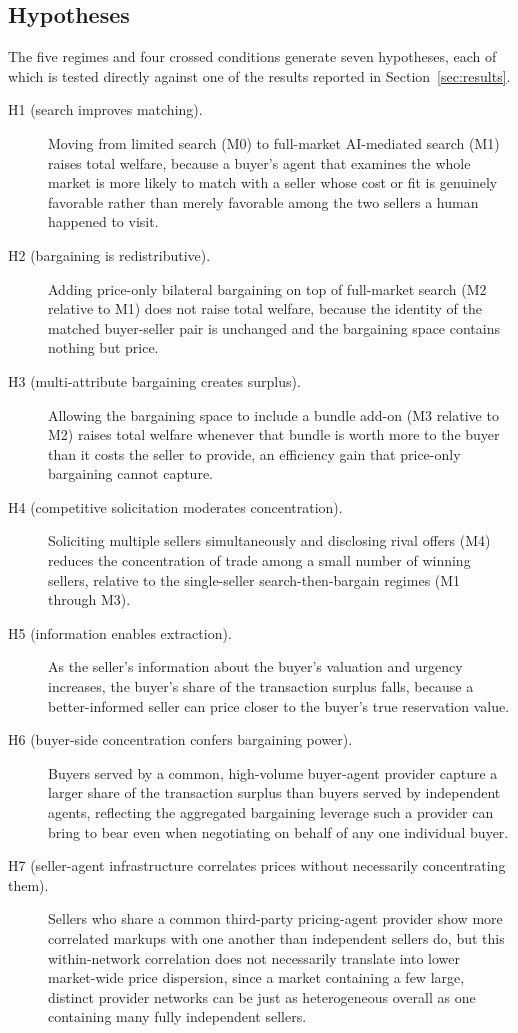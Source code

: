 \documentclass[review]{elsarticle}
\begin{document}
\subsection{Hypotheses}

The five regimes and four crossed conditions generate seven hypotheses, each of which is tested directly against one of the results reported in Section~\ref{sec:results}.

\begin{description}
\item[H1 (search improves matching).] Moving from limited search (M0) to full-market AI-mediated search (M1) raises total welfare, because a buyer's agent that examines the whole market is more likely to match with a seller whose cost or fit is genuinely favorable rather than merely favorable among the two sellers a human happened to visit.
\item[H2 (bargaining is redistributive).] Adding price-only bilateral bargaining on top of full-market search (M2 relative to M1) does not raise total welfare, because the identity of the matched buyer-seller pair is unchanged and the bargaining space contains nothing but price.
\item[H3 (multi-attribute bargaining creates surplus).] Allowing the bargaining space to include a bundle add-on (M3 relative to M2) raises total welfare whenever that bundle is worth more to the buyer than it costs the seller to provide, an efficiency gain that price-only bargaining cannot capture.
\item[H4 (competitive solicitation moderates concentration).] Soliciting multiple sellers simultaneously and disclosing rival offers (M4) reduces the concentration of trade among a small number of winning sellers, relative to the single-seller search-then-bargain regimes (M1 through M3).
\item[H5 (information enables extraction).] As the seller's information about the buyer's valuation and urgency increases, the buyer's share of the transaction surplus falls, because a better-informed seller can price closer to the buyer's true reservation value.
\item[H6 (buyer-side concentration confers bargaining power).] Buyers served by a common, high-volume buyer-agent provider capture a larger share of the transaction surplus than buyers served by independent agents, reflecting the aggregated bargaining leverage such a provider can bring to bear even when negotiating on behalf of any one individual buyer.
\item[H7 (seller-agent infrastructure correlates prices without necessarily concentrating them).] Sellers who share a common third-party pricing-agent provider show more correlated markups with one another than independent sellers do, but this within-network correlation does not necessarily translate into lower market-wide price dispersion, since a market containing a few large, distinct provider networks can be just as heterogeneous overall as one containing many fully independent sellers.
\end{description}
\end{document}
